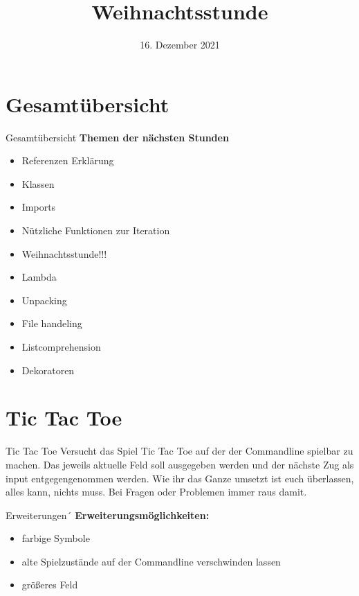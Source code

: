 



\title{Weihnachtsstunde}
\date{16. Dezember 2021}


	
\maketitle

\section*{Gesamtübersicht}
\begin{frame}{Gesamtübersicht}
	\textbf{Themen der nächsten Stunden}
	\begin{itemize}
		\item Referenzen Erklärung
		\item  Klassen
		\item Imports
		\item Nützliche Funktionen zur Iteration
		\item \alert{\Large{Weihnachtsstunde!!!}}
		\item Lambda
		\item Unpacking
		\item File handeling
		\item Listcomprehension
		\item Dekoratoren
	\end{itemize}
\end{frame}

\section{Tic Tac Toe}

\begin{frame}{Tic Tac Toe}
	Versucht das Spiel Tic Tac Toe auf der der Commandline spielbar zu machen. Das jeweils aktuelle Feld soll ausgegeben werden und der nächste Zug als input entgegengenommen werden. Wie ihr das Ganze umsetzt ist euch überlassen, alles kann, nichts muss. Bei Fragen oder Problemen immer raus damit.\linebreak
\end{frame}

\begin{frame}{Erweiterungen´}
	\textbf{Erweiterungsmöglichkeiten:}
	\begin{itemize}
		\item farbige Symbole
		\item alte Spielzustände auf der Commandline verschwinden lassen
		\item größeres Feld
	\end{itemize}
\end{frame}


